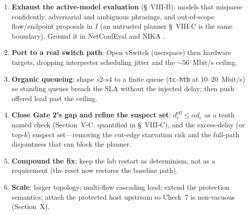 \documentclass[conference]{IEEEtran}
\begin{document}
\begin{enumerate}
  \item \textbf{Exhaust the active-model evaluation} (\S~VIII-B): models
    that misparse confidently, adversarial and ambiguous phrasings, and
    out-of-scope flow/endpoint proposals in $I$ (an untrusted planner
    \S~VIII-C is the same boundary). Ground it in NetConfEval
    \cite{wang2024netconfeval} and NIKA \cite{wang2025nika}.
  \item \textbf{Port to a real switch path}: Open vSwitch (userspace)
    then hardware targets, dropping interpreter scheduling jitter and the
    $\sim$56~Mbit/s ceiling.
  \item \textbf{Organic queueing}: shape $s2$-$s4$ to a finite queue
    (\texttt{tc-htb} at $10$--$20$~Mbit/s) so standing queues breach the SLA
    without the injected delay; then push offered load past the ceiling.
  \item \textbf{Close Gate 2's gap and refine the suspect set}:
    $d^{\mathrm{eff}}_e \le \alpha d_e$ as a tenth named check
    (Section~V-C, quantified in \S~VIII-C), and the excess-delay (or
    top-$k$) suspect set---removing the cut-edge starvation risk and the
    full-path disjointness that can block the planner.
  \item \textbf{Compound the fix}; keep the lab restart as determinism,
    not as a requirement (the reset now restores the baseline path).
  \item \textbf{Scale}: larger topology; multi-flow cascading load; extend
    the protection semantics; attach the protected host upstream so
    Check~7 is non-vacuous (Section~X).
\end{enumerate}



\end{document}
